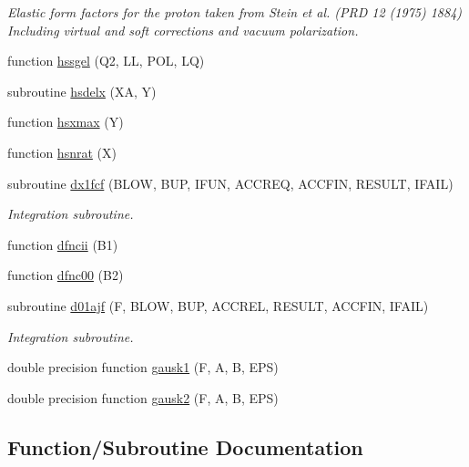 \begin{DoxyCompactItemize}
\begin{DoxyCompactList}\small\item\em Elastic form factors for the proton taken from Stein et al. (P\+RD 12 (1975) 1884) Including virtual and soft corrections and vacuum polarization. \end{DoxyCompactList}\item 
function \hyperlink{djangoh__h_8f_a918dcf0a3a5bd7f308fc93c75334a9f4}{hssgel} (Q2, LL, P\+OL, LQ)
\item 
subroutine \hyperlink{djangoh__h_8f_ad7162d5427175126bfe004753ea1bd70}{hsdelx} (XA, Y)
\item 
function \hyperlink{djangoh__h_8f_ab9eabf4f063a0cd023ce1a85f9bf8032}{hsxmax} (Y)
\item 
function \hyperlink{djangoh__h_8f_aaa4433d273f93a7dc6df818581550188}{hsnrat} (X)
\item 
subroutine \hyperlink{djangoh__h_8f_a4f17d177d9df6c5976dd9b3fba939dec}{dx1fcf} (B\+L\+OW, B\+UP, I\+F\+UN, A\+C\+C\+R\+EQ, A\+C\+C\+F\+IN, R\+E\+S\+U\+LT, I\+F\+A\+IL)
\begin{DoxyCompactList}\small\item\em Integration subroutine. \end{DoxyCompactList}\item 
function \hyperlink{djangoh__h_8f_a8423a3e922ac2752697c02850b5e3954}{dfncii} (B1)
\item 
function \hyperlink{djangoh__h_8f_a31e46a579ba814863858c9d93756893d}{dfnc00} (B2)
\item 
subroutine \hyperlink{djangoh__h_8f_a5575d5270ee0e5cede47701657715310}{d01ajf} (F, B\+L\+OW, B\+UP, A\+C\+C\+R\+EL, R\+E\+S\+U\+LT, A\+C\+C\+F\+IN, I\+F\+A\+IL)
\begin{DoxyCompactList}\small\item\em Integration subroutine. \end{DoxyCompactList}\item 
double precision function \hyperlink{djangoh__h_8f_a1aed970120eadb2285e5b9ce8df951bf}{gausk1} (F, A, B, E\+PS)
\item 
double precision function \hyperlink{djangoh__h_8f_aaf9cf7dde73f44b854176970c334b11b}{gausk2} (F, A, B, E\+PS)
\end{DoxyCompactItemize}


\subsection{Function/\+Subroutine Documentation}
\mbox{\label{djangoh__h_8f_af302ea72f46852040a91bbc6903668bb}} 
